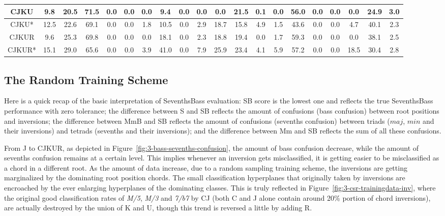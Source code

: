 \begin{table*}[h]
\begin{adjustbox}{width=1.3\columnwidth,center=\textwidth}
\begin{tabular}{|c|c|c|c|c|c|c|c|c|c|c|c|c|c|c|c|c|c|c|c|}
CJKU & 9.8 & 20.5 & 71.5 & 0.0 & 0.0 & 0.0 & 9.4 & 0.0 & 0.0 & 0.0 & 21.5 & 0.1 & 0.0 & 56.0 & 0.0 & 0.0 & 0.0 & 24.9 & 3.0\\ \hline
CJKU* & 12.5 & 22.6 & 69.1 & 0.0 & 0.0 & 1.8 & 10.5 & 0.0 & 2.9 & 18.7 & 15.8 & 4.9 & 1.5 & 43.6 & 0.0 & 0.0 & 4.7 & 40.1 & 2.3\\ \hline
CJKUR & 9.6 & 25.3 & 69.8 & 0.0 & 0.0 & 0.0 & 18.1 & 0.0 & 2.3 & 18.8 & 19.4 & 0.0 & 1.7 & 59.3 & 0.0 & 0.0 & 0.0 & 38.1 & 2.5 \\ \hline
CJKUR* & 15.1 & 29.0 & 65.6 & 0.0 & 0.0 & 3.9 & 41.0 & 0.0 & 7.9 & 25.9 & 23.4 & 4.1 & 5.9 & 57.2 & 0.0 & 0.0 & 18.5 & 30.4 & 2.8\\ \hline
\end{tabular}
\end{adjustbox}
\end{table*}

\subsection{The Random Training Scheme}
Here is a quick recap of the basic interpretation of SeventhsBass evaluation: SB score is the lowest one and reflects the true SeventhsBass performance with zero tolerance; the difference between S and SB reflects the amount of confusions (bass confusion) between root positions and inversions; the difference between MmB and SB reflects the amount of confusions (sevenths confusion) between triads ($maj$, $min$ and their inversions) and tetrads (sevenths and their inversions); and the difference between Mm and SB reflects the sum of all these confusions.

From J to CJKUR, as depicted in Figure~\ref{fig:3-bass-sevenths-confusion}, the amount of bass confusion decrease, while the amount of sevenths confusion remains at a certain level. This implies whenever an inversion gets misclassified, it is getting easier to be misclassified as a chord in a different root. As the amount of data increase, due to a random sampling training scheme, the inversions are getting marginalized by the dominating root position chords. The small classification hyperplanes that originally taken by inversions are encroached by the ever enlarging hyperplanes of the dominating classes. This is truly reflected in Figure~\ref{fig:3-csr-trainingdata-inv}, where the original good classification rates of \textit{M/5}, \textit{M/3} and \textit{7/b7} by CJ (both C and J alone contain around 20\% portion of chord inversions), are actually destroyed by the union of K and U, though this trend is reversed a little by adding R.

